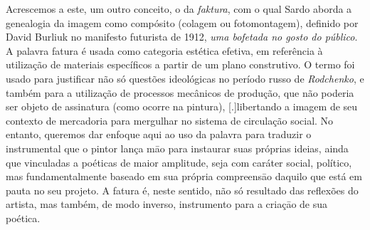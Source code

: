 Acrescemos a este, um outro conceito, o da \emph{faktura}, com o qual
Sardo aborda a genealogia da imagem como compósito (colagem ou
fotomontagem), definido por David Burliuk no manifesto futurista de
1912, \emph{uma bofetada no gosto do público}. A palavra fatura é usada
como categoria estética efetiva, em referência à utilização de
materiais específicos a partir de um plano construtivo. O termo foi
usado para justificar não só questões ideológicas no período russo de
\emph{Rodchenko}, e também para a utilização de processos mecânicos de
produção, que não poderia ser objeto de assinatura (como ocorre na
pintura), [.]{libertando a
	imagem de seu contexto de mercadoria para mergulhar no sistema de
	circulação social}. No entanto, queremos dar enfoque aqui ao uso da
palavra para traduzir o instrumental que o pintor lança māo para
instaurar suas próprias ideias, ainda que vinculadas a poéticas de
maior amplitude, seja com caráter social, político, mas
fundamentalmente baseado em sua própria compreensāo daquilo que está em
pauta no seu projeto. A fatura é, neste sentido, não só resultado das
reflexões do artista, mas também, de modo inverso, instrumento para a
criaçāo de sua poética.
